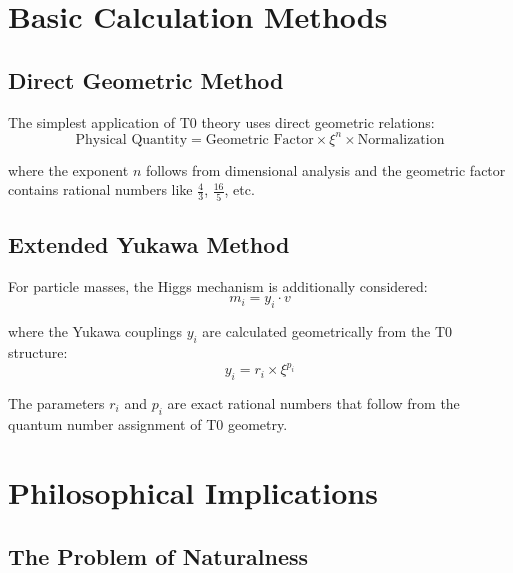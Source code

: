 	\section{Basic Calculation Methods}
	
	\subsection{Direct Geometric Method}
	
	The simplest application of T0 theory uses direct geometric relations:
	\begin{equation}
		\text{Physical Quantity} = \text{Geometric Factor} \times \xi^n \times \text{Normalization}
		\label{eq:direct_method}
	\end{equation}
	
	where the exponent $n$ follows from dimensional analysis and the geometric factor contains rational numbers like $\frac{4}{3}$, $\frac{16}{5}$, etc.
	
	\subsection{Extended Yukawa Method}
	
	For particle masses, the Higgs mechanism is additionally considered:
	\begin{equation}
		m_i = y_i \cdot v
		\label{eq:yukawa_method}
	\end{equation}
	
	where the Yukawa couplings $y_i$ are calculated geometrically from the T0 structure:
	\begin{equation}
		y_i = r_i \times \xi^{p_i}
		\label{eq:yukawa_coupling}
	\end{equation}
	
	The parameters $r_i$ and $p_i$ are exact rational numbers that follow from the quantum number assignment of T0 geometry.
	
	\section{Philosophical Implications}
	
	\subsection{The Problem of Naturalness}
	
